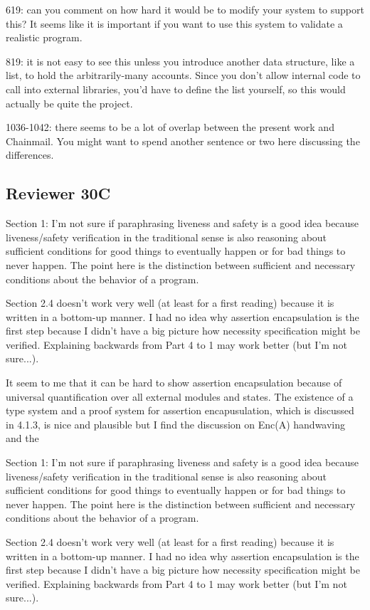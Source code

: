 \documentclass[11pt]{amsart}
\begin{document}
619: can you comment on how hard it would be to modify your system to support this? It seems like it is important if you want to use this system to validate a realistic program.

819: it is not easy to see this unless you introduce another data structure, like a list, to hold the arbitrarily-many accounts. Since you don’t allow internal code to call into external libraries, you’d have to define the list yourself, so this would actually be quite the project.

1036-1042: there seems to be a lot of overlap between the present work and Chainmail. You might want to spend another sentence or two here discussing the differences.
  
 
  \subsection*{Reviewer 30C}
  

Section 1: I'm not sure if paraphrasing liveness and safety is a good
idea because liveness/safety verification in the traditional sense is
also reasoning about sufficient conditions for good things to
eventually happen or for bad things to never happen.  The point
here is the distinction between sufficient and necessary conditions
about the behavior of a program.

Section 2.4 doesn't work very well (at least for a first reading)
because it is written in a bottom-up manner.  I had no idea why
assertion encapsulation is the first step because I didn't have a big
picture how necessity specification might be verified.  Explaining backwards from Part 4 to 1
may work better (but I'm not sure...).

It seem to me that it can be hard to show assertion encapsulation
because of universal quantification over all external modules and
states.  The existence of a type system and a proof system for
assertion encapusulation, which is discussed in 4.1.3, is nice and
plausible but I find the discussion on Enc(A) handwaving and the
  


Section 1: I'm not sure if paraphrasing liveness and safety is a good
idea because liveness/safety verification in the traditional sense is
also reasoning about sufficient conditions for good things to
eventually happen or for bad things to never happen.  The point
here is the distinction between sufficient and necessary conditions
about the behavior of a program.

Section 2.4 doesn't work very well (at least for a first reading)
because it is written in a bottom-up manner.  I had no idea why
assertion encapsulation is the first step because I didn't have a big
picture how necessity specification might be verified.  Explaining backwards from Part 4 to 1
may work better (but I'm not sure...).
\end{document}
